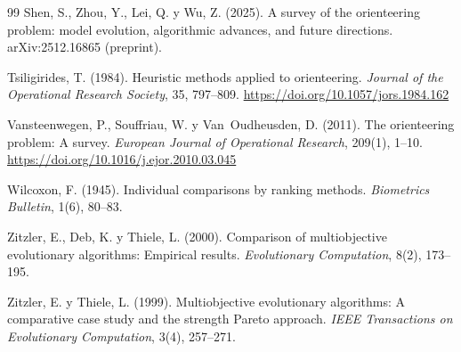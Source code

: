 \begin{thebibliography}{99}
Shen, S., Zhou, Y., Lei, Q. y Wu, Z. (2025).
\newblock A survey of the orienteering problem: model evolution, algorithmic advances, and future directions.
\newblock arXiv:2512.16865 (preprint).

Tsiligirides, T. (1984).
\newblock Heuristic methods applied to orienteering.
\newblock \emph{Journal of the Operational Research Society}, 35, 797--809.
\newblock \url{https://doi.org/10.1057/jors.1984.162}

Vansteenwegen, P., Souffriau, W. y Van~Oudheusden, D. (2011).
\newblock The orienteering problem: A survey.
\newblock \emph{European Journal of Operational Research}, 209(1), 1--10.
\newblock \url{https://doi.org/10.1016/j.ejor.2010.03.045}

Wilcoxon, F. (1945).
\newblock Individual comparisons by ranking methods.
\newblock \emph{Biometrics Bulletin}, 1(6), 80--83.

Zitzler, E., Deb, K. y Thiele, L. (2000).
\newblock Comparison of multiobjective evolutionary algorithms: Empirical results.
\newblock \emph{Evolutionary Computation}, 8(2), 173--195.

Zitzler, E. y Thiele, L. (1999).
\newblock Multiobjective evolutionary algorithms: A comparative case study and the strength Pareto approach.
\newblock \emph{IEEE Transactions on Evolutionary Computation}, 3(4), 257--271.

\end{thebibliography}
